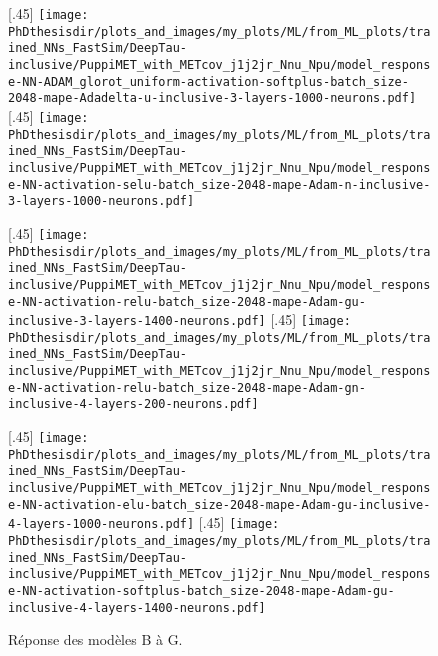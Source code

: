 \begin{figure}[p]
\centering

[.45\textwidth]
{\texttt{[image: \\PhDthesisdir/plots\_and\_images/my\_plots/ML/from\_ML\_plots/trained\_NNs\_FastSim/DeepTau-inclusive/PuppiMET\_with\_METcov\_j1j2jr\_Nnu\_Npu/model\_response-NN-ADAM\_glorot\_uniform-activation-softplus-batch\_size-2048-mape-Adadelta-u-inclusive-3-layers-1000-neurons.pdf]}\vspace{-.5\baselineskip}}
\hfill
{}[.45\textwidth]
{\texttt{[image: \\PhDthesisdir/plots\_and\_images/my\_plots/ML/from\_ML\_plots/trained\_NNs\_FastSim/DeepTau-inclusive/PuppiMET\_with\_METcov\_j1j2jr\_Nnu\_Npu/model\_response-NN-activation-selu-batch\_size-2048-mape-Adam-n-inclusive-3-layers-1000-neurons.pdf]}\vspace{-.5\baselineskip}}

[.45\textwidth]
{\texttt{[image: \\PhDthesisdir/plots\_and\_images/my\_plots/ML/from\_ML\_plots/trained\_NNs\_FastSim/DeepTau-inclusive/PuppiMET\_with\_METcov\_j1j2jr\_Nnu\_Npu/model\_response-NN-activation-relu-batch\_size-2048-mape-Adam-gu-inclusive-3-layers-1400-neurons.pdf]}\vspace{-.5\baselineskip}}
\hfill
{}[.45\textwidth]
{\texttt{[image: \\PhDthesisdir/plots\_and\_images/my\_plots/ML/from\_ML\_plots/trained\_NNs\_FastSim/DeepTau-inclusive/PuppiMET\_with\_METcov\_j1j2jr\_Nnu\_Npu/model\_response-NN-activation-relu-batch\_size-2048-mape-Adam-gn-inclusive-4-layers-200-neurons.pdf]}\vspace{-.5\baselineskip}}

[.45\textwidth]
{\texttt{[image: \\PhDthesisdir/plots\_and\_images/my\_plots/ML/from\_ML\_plots/trained\_NNs\_FastSim/DeepTau-inclusive/PuppiMET\_with\_METcov\_j1j2jr\_Nnu\_Npu/model\_response-NN-activation-elu-batch\_size-2048-mape-Adam-gu-inclusive-4-layers-1000-neurons.pdf]}\vspace{-.5\baselineskip}}
\hfill
{}[.45\textwidth]
{\texttt{[image: \\PhDthesisdir/plots\_and\_images/my\_plots/ML/from\_ML\_plots/trained\_NNs\_FastSim/DeepTau-inclusive/PuppiMET\_with\_METcov\_j1j2jr\_Nnu\_Npu/model\_response-NN-activation-softplus-batch\_size-2048-mape-Adam-gu-inclusive-4-layers-1400-neurons.pdf]}\vspace{-.5\baselineskip}}

\caption{Réponse des modèles B à G.}
\label{fig-reponse_model_B_to_G}
\end{figure}
